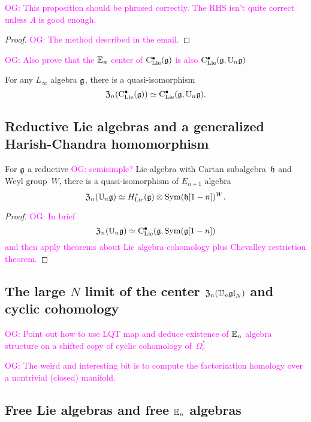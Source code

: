 \documentclass[11pt]{amsart}
\numberwithin{equation}{section}
\def\owen{\textcolor{magenta}{OG: }\textcolor{magenta}}
\begin{document}
\owen{This proposition should be phrased correctly. The RHS isn't quite correct unless $A$ is good enough.}

\begin{proof}
\owen{The method described in the email.}
\end{proof}

\owen{Also prove that the $\mathbb E_n$ center of ${\rm C}_{\rm Lie}^\bullet(\mathfrak g)$ is also ${\rm C}_{\rm Lie}^\bullet(\mathfrak g, \mathbb U_n \mathfrak g)$}

\begin{cor}
\label{cor: koszul dual to main theorem}
For any $L_\infty$ algebra $\mathfrak g$,
there is a quasi-isomorphism
\[
{\frak Z}_n({\rm C}_{\rm Lie}^\bullet(\mathfrak g)) \simeq {\rm C}_{\rm Lie}^\bullet(\mathfrak g, \mathbb U_n \mathfrak g).
\]
\end{cor}

\subsection{Reductive Lie algebras and a generalized Harish-Chandra homomorphism}

\begin{prp}
For $\mathfrak g$ a reductive \owen{semisimple?} Lie algebra with Cartan subalgebra~$\mathfrak h$ and Weyl group~$W$, 
there is a quasi-isomorphism of $E_{n+1}$ algebra
\[
{\frak Z}_n(\mathbb U_n \mathfrak g) \simeq H^*_{\rm Lie}(\mathfrak g) \otimes {\rm Sym}(\mathfrak h[1-n])^W.
\]
\end{prp}

\begin{proof}
\owen{In brief
\[
{\frak Z}_n(\mathbb U_n \mathfrak g) \simeq {\rm C}_{\rm Lie}^\bullet(\mathfrak g, {\rm Sym}(\mathfrak g[1-n])
\]
and then apply theorems about Lie algebra cohomology plus Chevalley restriction theorem.}
\end{proof}

\subsection{The large $N$ limit of the center ${\frak Z}_n(\mathbb U_n \frak{gl}_N)$ and cyclic cohomology}

\owen{Point out how to use LQT map and deduce existence of $\mathbb E_n$ algebra structure on a shifted copy of cyclic cohomology of~$\Omega^*_c$}

\owen{The weird and interesting bit is to compute the factorization homology over a nontrivial (closed) manifold.}

\subsection{Free Lie algebras and free $\mathbb E_n$ algebras}
\end{document}
